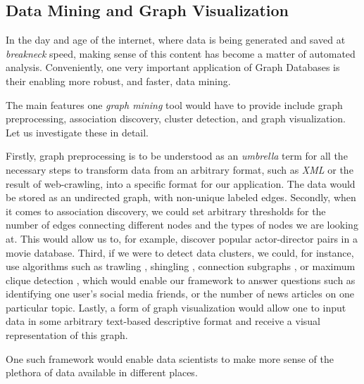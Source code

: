 \documentclass[10pt,        %
               a4paper,     %
               journal,     %
               ]{IEEEtran}
\begin{document}
\subsection{Data Mining and Graph Visualization}
In the day and age of the internet, where data is being generated and saved at \textit{breakneck} speed, making sense of this content has become a matter of automated analysis. Conveniently, one very important application of Graph Databases is their enabling more robust, and faster, data mining. \par
The main features one \textit{graph mining} tool would have to provide include graph preprocessing, association discovery, cluster detection, and graph visualization. Let us investigate these in detail. \par
Firstly, graph preprocessing is to be understood as an \textit{umbrella} term for all the necessary steps to transform data from an arbitrary format, such as \textit{XML} or the result of web-crawling, into a specific format for our application. The data would be stored as an undirected graph, with non-unique labeled edges. \cite{IEEEpaper2:mining} Secondly, when it comes to association discovery, we could set arbitrary thresholds for the number of edges connecting different nodes and the types of nodes we are looking at. This would allow us to, for example, discover popular actor-director pairs in a movie database. Third, if we were to detect data clusters, we could, for instance, use algorithms such as trawling \cite{paper_2_ref_1}, shingling \cite{paper_2_ref_2}, connection subgraphs \cite{paper_2_ref_3}, or maximum clique detection \cite{paper_2_ref_4}, which would enable our framework to answer questions such as identifying one user's social media friends, or the number of news articles on one particular topic. Lastly, a form of graph visualization would allow one to input data in some arbitrary text-based descriptive format and receive a visual representation of this graph. \par
One such framework would enable data scientists to make more sense of the plethora of data available in different places. 
\end{document}
